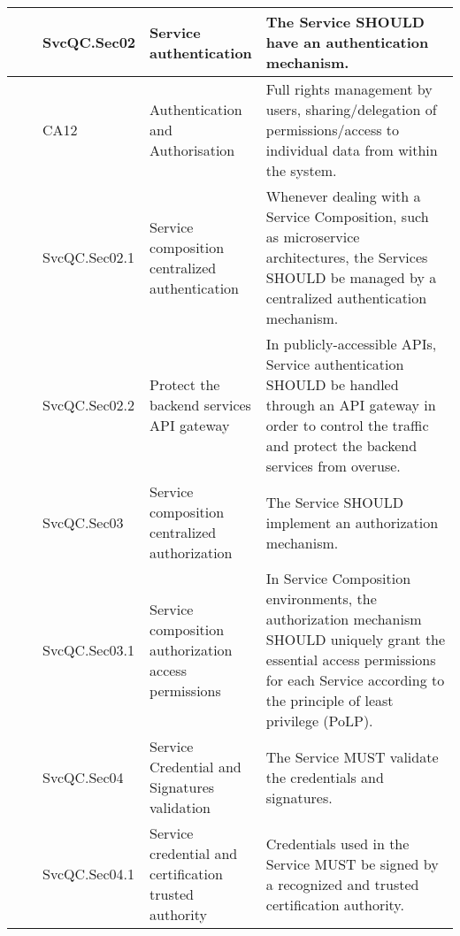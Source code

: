 \begin{center}
    \tabletail{\hline}
    \tiny
    \begin{supertabular}{|p{0.10\linewidth}|p{0.10\linewidth}|p{0.20\linewidth}|p{0.60\linewidth}|} \hline
        \cite{orviz_fernandez_eosc-synergy_2020} & SvcQC.Sec02 & Service authentication & The Service SHOULD have an authentication mechanism.\\ \hline
        \cite{shepherdson_cessda_2019} & CA12 & Authentication and Authorisation & Full rights management by users, sharing/delegation of permissions/access to individual data from within the system.\\ \hline
        \cite{orviz_fernandez_eosc-synergy_2020} & SvcQC.Sec02.1 & Service composition centralized authentication & Whenever dealing with a Service Composition, such as microservice architectures, the Services SHOULD be managed by a centralized authentication mechanism.\\ \hline
        \cite{orviz_fernandez_eosc-synergy_2020} & SvcQC.Sec02.2 & Protect the backend services API gateway & In publicly-accessible APIs, Service authentication SHOULD be handled through an API gateway in order to control the traffic and protect the backend services from overuse.\\ \hline
        \cite{orviz_fernandez_eosc-synergy_2020} & SvcQC.Sec03 & Service composition centralized authorization & The Service SHOULD implement an authorization mechanism.\\ \hline
        \cite{orviz_fernandez_eosc-synergy_2020} & SvcQC.Sec03.1 & Service composition authorization access permissions & In Service Composition environments, the authorization mechanism SHOULD uniquely grant the essential access permissions for each Service according to the principle of least privilege (PoLP).\\ \hline
        \cite{orviz_fernandez_eosc-synergy_2020} & SvcQC.Sec04 & Service Credential and Signatures validation & The Service MUST validate the credentials and signatures.\\ \hline
        \cite{orviz_fernandez_eosc-synergy_2020} & SvcQC.Sec04.1 & Service credential and certification trusted authority & Credentials used in the Service MUST be signed by a recognized and trusted certification authority.\\ \hline
    \end{supertabular}
\end{center}

